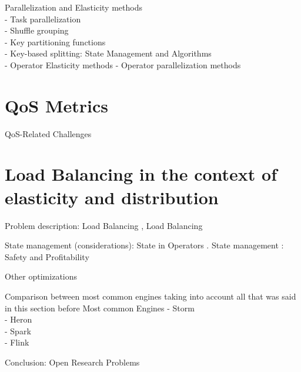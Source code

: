   Parallelization and Elasticity methods \cite{R_ger_2019}\\
  - Task parallelization \cite{R_ger_2019}\\
  - Shuffle grouping \cite{R_ger_2019}\\
  - Key partitioning functions \cite{R_ger_2019}\\
  - Key-based splitting: State Management and Algorithms \cite{R_ger_2019}\\
  - Operator Elasticity methods \cite{R_ger_2019}
  - Operator parallelization methods \cite{R_ger_2019}


  \section{QoS Metrics}
  QoS-Related Challenges\cite{chakravarthy2009stream}
  \section{Load Balancing in the context of elasticity and distribution}

  Problem description: Load Balancing  \cite{Hirzel_2014},   Load Balancing \cite{R_ger_2019}

  State management (considerations): State in Operators \cite{R_ger_2019}. State management \cite{R_ger_2019}: Safety and Profitability \cite{Schneider_2013}\cite{R_ger_2019}

  Other optimizations

  Comparison between most common engines taking into account all that was said in this section before
  Most common Engines  \cite{kamburugamuve2013survey}
  - Storm  \cite{kamburugamuve2013survey} \cite{R_ger_2019}\\
  - Heron \cite{R_ger_2019}\\
  - Spark \cite{R_ger_2019}\\
  - Flink \cite{R_ger_2019}

  Conclusion: Open Research Problems \cite{Schneider_2013}

